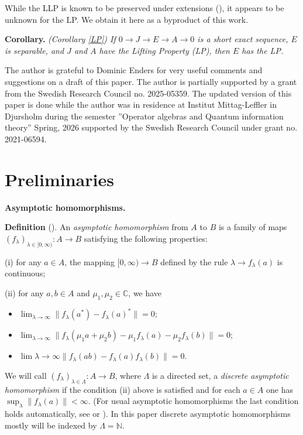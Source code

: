 \documentclass{article}%
\begin{document}
 \noindent While the LLP is known to be preserved under extensions (\cite[Cor. 2.6.]{Kirchberg}), it appears  to be unknown for the LP. We obtain it here as a byproduct of this work.

{\bf Corollary.} {\it (Corollary \ref{LP}) If $0\to J\to E\to A\to 0$ is a short exact sequence,  $E$ is separable, and $J$ and $A$ have the Lifting Property (LP), then $E$ has the LP.}


\medskip

 The author is grateful to Dominic Enders for  very useful comments and suggestions on a draft of this paper.
  The author is partially supported by a grant from the Swedish Research Council no. 2025-05359. The updated version of this paper is done while the author was in residence at Institut Mittag-Leffler in Djursholm during the semester ”Operator algebras and Quantum information theory” Spring, 2026 supported by the Swedish Research Council under grant no. 2021-06594.



\section{Preliminaries}

{\bf Asymptotic homomorphisms. }

\medskip

{\bf Definition} (\cite{ConnesHigson}). An {\it asymptotic homomorphism} from $A$ to $B$ is a family of maps $(f_{\lambda})_{\lambda\in [0,\infty)}: A \to B$ satisfying the following properties:

\medskip

(i) for any $a\in A$, the mapping $[0, \infty) \to B$ defined by the rule $\lambda \to f_{\lambda}(a)$  is continuous;

(ii) for any $a, b\in A$ and $\mu_1, \mu_2\in \mathbb C$, we have

\begin{itemize}
\item  $\lim_{\lambda\to \infty} \|f_{\lambda}(a^*) - f_{\lambda}(a)^*\| = 0;$
\item  $\lim_{\lambda\to \infty} \|f_{\lambda}(\mu_1a + \mu_2b) - \mu_1f_{\lambda}(a) - \mu_2f_{\lambda}(b)\| = 0;$
\item $\lim{\lambda\to \infty}  \|f_{\lambda}(ab) - f_{\lambda}(a)f_{\lambda}(b)\| = 0.$
\end{itemize}

We will call $(f_{\lambda})_{\lambda\in \Lambda}: A \to B$, where $\Lambda$ is a directed set,   a {\it discrete asymptotic homomorphism} if the condition (ii) above is satisfied and for each $a\in A$ one has $\sup_{\lambda} \|f_{\lambda}(a)\|< \infty$. (For usual asymptotic homomorphisms the last condition holds automatically, see \cite{ConnesHigson} or \cite{Dadarlat2}). In this paper discrete asymptotic homomorphisms mostly will be indexed by $\Lambda = \mathbb N$.
\end{document}
